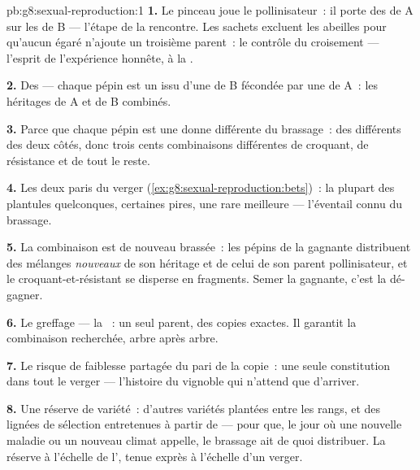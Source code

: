 \begin{solution}{pb:g8:sexual-reproduction:1}
\textbf{1.} Le pinceau joue le pollinisateur~: il porte des 
 de A sur les  de B --- l'étape de la rencontre. Les
sachets excluent les abeilles pour qu'aucun  égaré n'ajoute un
troisième parent~: le contrôle du croisement --- l'esprit de
l'expérience honnête, à la .

\textbf{2.} Des  --- chaque pépin est un  issu d'une
 de B fécondée par une  de A~: les héritages
de A et de B combinés.

\textbf{3.} Parce que chaque pépin est une donne différente du
brassage~: des  différents des deux côtés, donc trois cents
combinaisons différentes de croquant, de résistance et de tout le
reste.

\textbf{4.} Les deux paris du verger
(\cref{ex:g8:sexual-reproduction:bets})~: la plupart des plantules
quelconques, certaines pires, une rare meilleure --- l'éventail
connu du brassage.

\textbf{5.} La combinaison est de nouveau brassée~: les pépins de la
gagnante distribuent des mélanges \emph{nouveaux} de son héritage et
de celui de son parent pollinisateur, et le croquant-et-résistant se
disperse en fragments. Semer la gagnante, c'est la dé-gagner.

\textbf{6.} Le greffage --- la ~: un seul
parent, des copies exactes. Il garantit la combinaison recherchée,
arbre après arbre.

\textbf{7.} Le risque de faiblesse partagée du pari de la copie~:
une seule constitution dans tout le verger --- l'histoire du
vignoble qui n'attend que d'arriver.

\textbf{8.} Une réserve de variété~: d'autres variétés plantées
entre les rangs, et des lignées de sélection entretenues à partir de
 --- pour que, le jour où une nouvelle maladie ou un nouveau
climat appelle, le brassage ait de quoi distribuer. La réserve à
l'échelle de l', tenue exprès à l'échelle d'un verger.


\end{solution}
